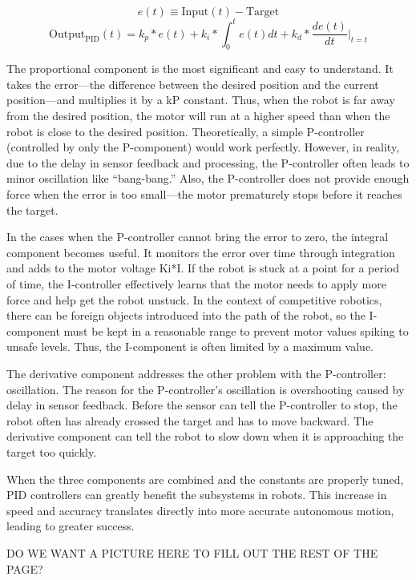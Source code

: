 \[ e(t) \equiv \text{Input}(t) - \text{Target} \]
\[ \text{Output}_{\text{PID}}(t) = k_p * e(t) + k_i * \int_0^t{e(t)dt} + k_d * \frac{de(t)}{dt}|_{t=t} \]

The proportional component is the most significant and easy to understand. It takes the error—the difference between the desired position and the current position—and multiplies it by a kP constant. Thus, when the robot is far away from the desired position, the motor will run at a higher speed than when the robot is close to the desired position. Theoretically, a simple P-controller (controlled by only the P-component) would work perfectly. However, in reality, due to the delay in sensor feedback and processing, the P-controller often leads to minor oscillation like “bang-bang.” Also, the P-controller does not provide enough force when the error is too small—the motor prematurely stops before it reaches the target.

In the cases when the P-controller cannot bring the error to zero, the integral component becomes useful. It monitors the error over time through integration and adds to the motor voltage Ki*I. If the robot is stuck at a point for a period of time, the I-controller effectively learns that the motor needs to apply more force and help get the robot unstuck. In the context of competitive robotics, there can be foreign objects introduced into the path of the robot, so the I-component must be kept in a reasonable range to prevent motor values spiking to unsafe levels. Thus, the I-component is often limited by a maximum value.

The derivative component addresses the other problem with the P-controller: oscillation. The reason for the P-controller’s oscillation is overshooting caused by delay in sensor feedback. Before the sensor can tell the P-controller to stop, the robot often has already crossed the target and has to move backward. The derivative component can tell the robot to slow down when it is approaching the target too quickly.

When the three components are combined and the constants are properly tuned, PID controllers can greatly benefit the subsystems in robots. This increase in speed and accuracy translates directly into more accurate autonomous motion, leading to greater success.

\begin{center}
    DO WE WANT A PICTURE HERE TO FILL OUT THE REST OF THE PAGE\@?
\end{center}